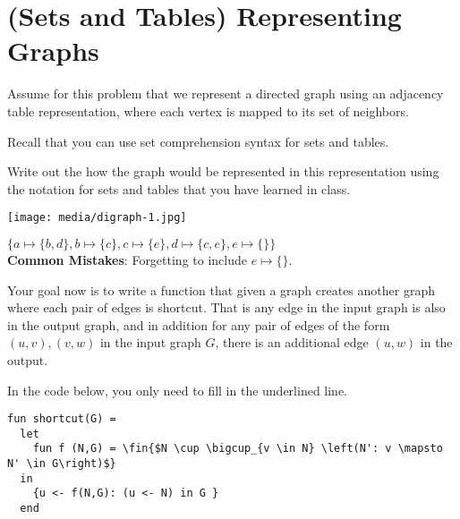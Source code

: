 \section{(Sets and Tables) Representing Graphs}


\begin{problem}

Assume for this problem that we represent a directed graph using an
adjacency table representation, where each vertex is mapped to its set
of neighbors. 

Recall that you can use set comprehension syntax for sets and tables.

\ask[5]
Write out the how the graph would be represented in this
representation using the notation for sets and tables that you have
learned in class.

\begin{center}
\texttt{[image: media/digraph-1.jpg]}
\end{center}

\sol
$\{a \mapsto \{b,d\}, b \mapsto \{c\}, c \mapsto \{e\}, d \mapsto \{c,e\}, e \mapsto \{\} \}$ \\

\notes
\textbf{Common Mistakes}: Forgetting to include $e \mapsto \{\}$. 


\ask[12]
Your goal now is to write a function that given a graph creates
another graph where each pair of edges is shortcut.  That is any edge
in the input graph is also in the output graph, and in addition for
any pair of edges of the form $(u,v),(v,w)$ in the input graph $G$,
there is an additional edge $(u,w)$ in the output.

In the code below, you only need to fill in the underlined line. 










\solfin
\begin{lstlisting}[numbers=none]
fun shortcut(G) = 
  let 
    fun f (N,G) = \fin{$N \cup \bigcup_{v \in N} \left(N': v \mapsto N' \in G\right)$}
  in   
    {u <- f(N,G): (u <- N) in G }
  end
\end{lstlisting}



\end{problem}
